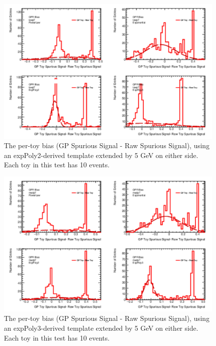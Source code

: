 \begin{figure} 
\begin{center}
  \includegraphics[width=\textwidth]{figures/background/gpr/validation/padded/ToyTest_FitSigBiases_lowpT_10_noSig}   
\caption{The per-toy bias (GP Spurious Signal - Raw Spurious Signal), using an expPoly2-derived template extended by 5 GeV on either side. Each toy in this test has 10 events.}
\label{fig:bias_padded_lowpt_10_noSig}
\end{center}
\end{figure}

\begin{figure} 
\begin{center}
  \includegraphics[width=\textwidth]{figures/background/gpr/validation/padded/ToyTest_FitSigBiases_medpT_10_noSig}   
\caption{The per-toy bias (GP Spurious Signal - Raw Spurious Signal), using an expPoly3-derived template extended by 5 GeV on either side. Each toy in this test has 10 events.}
\label{fig:bias_padded_medpt_10_noSig}
\end{center}
\end{figure}

